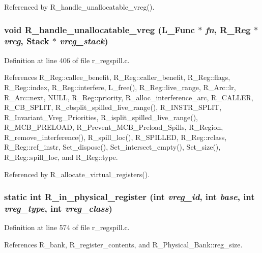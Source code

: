 Referenced by R\_\-handle\_\-unallocatable\_\-vreg().
\subsubsection{\setlength{\rightskip}{0pt plus 5cm}void R\_\-handle\_\-unallocatable\_\-vreg (L\_\-Func $\ast$ {\em fn}, \bf{R\_\-Reg} $\ast$ {\em vreg}, \bf{Stack} $\ast$ {\em vreg\_\-stack})}\label{r__regspill_8c_5f3a7dd764326338bc738c443c4987f9}




Definition at line 406 of file r\_\-regspill.c.

References R\_\-Reg::callee\_\-benefit, R\_\-Reg::caller\_\-benefit, R\_\-Reg::flags, R\_\-Reg::index, R\_\-Reg::interfere, L\_\-free(), R\_\-Reg::live\_\-range, R\_\-Arc::lr, R\_\-Arc::next, NULL, R\_\-Reg::priority, R\_\-alloc\_\-interference\_\-arc, R\_\-CALLER, R\_\-CB\_\-SPLIT, R\_\-cbsplit\_\-spilled\_\-live\_\-range(), R\_\-INSTR\_\-SPLIT, R\_\-Invariant\_\-Vreg\_\-Priorities, R\_\-isplit\_\-spilled\_\-live\_\-range(), R\_\-MCB\_\-PRELOAD, R\_\-Prevent\_\-MCB\_\-Preload\_\-Spills, R\_\-Region, R\_\-remove\_\-interference(), R\_\-spill\_\-loc(), R\_\-SPILLED, R\_\-Reg::rclass, R\_\-Reg::ref\_\-instr, Set\_\-dispose(), Set\_\-intersect\_\-empty(), Set\_\-size(), R\_\-Reg::spill\_\-loc, and R\_\-Reg::type.

Referenced by R\_\-allocate\_\-virtual\_\-registers().
\subsubsection{\setlength{\rightskip}{0pt plus 5cm}static int R\_\-in\_\-physical\_\-register (int {\em vreg\_\-id}, int {\em base}, int {\em vreg\_\-type}, int {\em vreg\_\-class})\hspace{0.3cm}{\tt  [static]}}\label{r__regspill_8c_901fdba198e2708ba1273c9eec6acd24}




Definition at line 574 of file r\_\-regspill.c.

References R\_\-bank, R\_\-register\_\-contents, and R\_\-Physical\_\-Bank::reg\_\-size.


